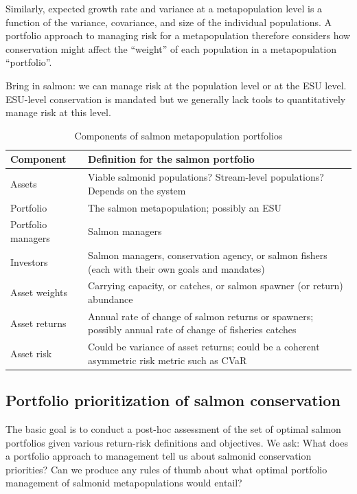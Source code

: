\documentclass[12pt]{article}
\begin{document}
Similarly, expected growth rate and variance at a metapopulation level
is a function of the variance, covariance, and size of the individual
populations. A portfolio approach to managing risk for a metapopulation
therefore considers how conservation might affect the ``weight'' of each
population in a metapopulation ``portfolio''.

Bring in salmon: we can manage risk at the population level or at the
ESU level. ESU-level conservation is mandated but we generally lack
tools to quantitatively manage risk at this level.

\begin{table}[h!]
\centering
\small
\caption{Components of salmon metapopulation portfolios}
\begin{tabular}{p{3.6cm}p{7.5cm}}
\toprule
Component & Definition for the salmon portfolio\\
\midrule
Assets & Viable salmonid populations? Stream-level populations? Depends on the 
system\\
Portfolio & The salmon metapopulation; possibly an ESU\\
Portfolio managers & Salmon managers\\
Investors & Salmon managers, conservation agency, or salmon fishers (each with 
their own goals and mandates)\\
Asset weights & Carrying capacity, or catches, or salmon spawner (or return) 
abundance\\
Asset returns & Annual rate of change of salmon returns or spawners; possibly 
annual rate of change of fisheries catches\\
Asset risk & Could be variance of asset returns; could be a coherent asymmetric 
risk metric such as CVaR\\
\bottomrule
\end{tabular}
\label{tab:port-components}
\end{table}

\subsection{Portfolio prioritization of salmon conservation}

The basic goal is to conduct a post-hoc assessment of the set of optimal
salmon portfolios given various return-risk definitions and objectives.
We ask: What does a portfolio approach to management tell us about
salmonid conservation priorities? Can we produce any rules of thumb
about what optimal portfolio management of salmonid metapopulations
would entail?
\end{document}
